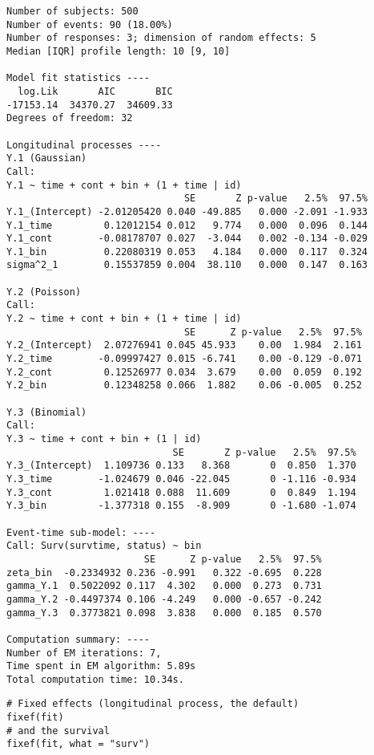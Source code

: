 \begin{small}
\begin{verbatim}
Number of subjects: 500
Number of events: 90 (18.00%)
Number of responses: 3; dimension of random effects: 5
Median [IQR] profile length: 10 [9, 10]

Model fit statistics ----
  log.Lik       AIC       BIC 
-17153.14  34370.27  34609.33 
Degrees of freedom: 32

Longitudinal processes ----
Y.1 (Gaussian)
Call:
Y.1 ~ time + cont + bin + (1 + time | id) 
                               SE       Z p-value   2.5%  97.5%
Y.1_(Intercept) -2.01205420 0.040 -49.885   0.000 -2.091 -1.933
Y.1_time         0.12012154 0.012   9.774   0.000  0.096  0.144
Y.1_cont        -0.08178707 0.027  -3.044   0.002 -0.134 -0.029
Y.1_bin          0.22080319 0.053   4.184   0.000  0.117  0.324
sigma^2_1        0.15537859 0.004  38.110   0.000  0.147  0.163

Y.2 (Poisson)
Call:
Y.2 ~ time + cont + bin + (1 + time | id) 
                               SE      Z p-value   2.5%  97.5%
Y.2_(Intercept)  2.07276941 0.045 45.933    0.00  1.984  2.161
Y.2_time        -0.09997427 0.015 -6.741    0.00 -0.129 -0.071
Y.2_cont         0.12526977 0.034  3.679    0.00  0.059  0.192
Y.2_bin          0.12348258 0.066  1.882    0.06 -0.005  0.252

Y.3 (Binomial)
Call:
Y.3 ~ time + cont + bin + (1 | id) 
                             SE       Z p-value   2.5%  97.5%
Y.3_(Intercept)  1.109736 0.133   8.368       0  0.850  1.370
Y.3_time        -1.024679 0.046 -22.045       0 -1.116 -0.934
Y.3_cont         1.021418 0.088  11.609       0  0.849  1.194
Y.3_bin         -1.377318 0.155  -8.909       0 -1.680 -1.074

Event-time sub-model: ----
Call: Surv(survtime, status) ~ bin
                        SE      Z p-value   2.5%  97.5%
zeta_bin  -0.2334932 0.236 -0.991   0.322 -0.695  0.228
gamma_Y.1  0.5022092 0.117  4.302   0.000  0.273  0.731
gamma_Y.2 -0.4497374 0.106 -4.249   0.000 -0.657 -0.242
gamma_Y.3  0.3773821 0.098  3.838   0.000  0.185  0.570

Computation summary: ----
Number of EM iterations: 7,
Time spent in EM algorithm: 5.89s
Total computation time: 10.34s.
\end{verbatim}
\end{small}
\begin{lstlisting}
# Fixed effects (longitudinal process, the default)
fixef(fit)
# and the survival
fixef(fit, what = "surv")
\end{lstlisting}

